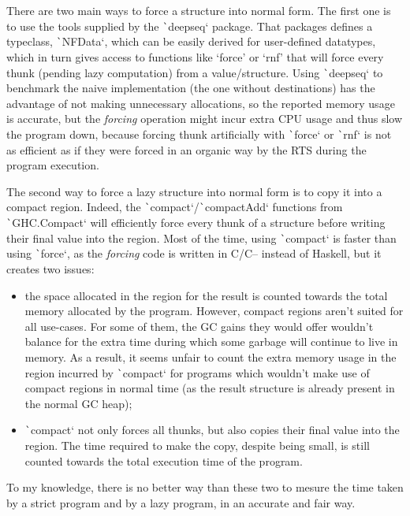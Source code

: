 \documentclass[english]{jflart}
\begin{document}
There are two main ways to force a structure into normal form. The first one is to use the tools supplied by the \texttt`deepseq` package. That packages defines a typeclass, \texttt`NFData`, which can be easily derived for user-defined datatypes, which in turn gives access to functions like `force' or `rnf' that will force every thunk (pending lazy computation) from a value/structure. Using \texttt`deepseq` to benchmark the naive implementation (the one without destinations) has the advantage of not making unnecessary allocations, so the reported memory usage is accurate, but the \emph{forcing} operation might incur extra CPU usage and thus slow the program down, because forcing thunk artificially with \texttt`force` or \texttt`rnf` is not as efficient as if they were forced in an organic way by the RTS during the program execution.

The second way to force a lazy structure into normal form is to copy it into a compact region. Indeed, the \texttt`compact`/\texttt`compactAdd` functions from \texttt`GHC.Compact` will efficiently force every thunk of a structure before writing their final value into the region. Most of the time, using \texttt`compact` is faster than using \texttt`force`, as the  \emph{forcing} code is written in C/C-- instead of Haskell, but it creates two issues:

\begin{itemize}
  \item the space allocated in the region for the result is counted towards the total memory allocated by the program. However, compact regions aren't suited for all use-cases. For some of them, the GC gains they would offer wouldn't balance for the extra time during which some garbage will continue to live in memory. As a result, it seems unfair to count the extra memory usage in the region incurred by \texttt`compact` for programs which wouldn't make use of compact regions in normal time (as the result structure is already present in the normal GC heap);
  \item \texttt`compact` not only forces all thunks, but also copies their final value into the region. The time required to make the copy, despite being small, is still counted towards the total execution time of the program.
\end{itemize}

To my knowledge, there is no better way than these two to mesure the time taken by a strict program and by a lazy program, in an accurate and fair way.
\end{document}
